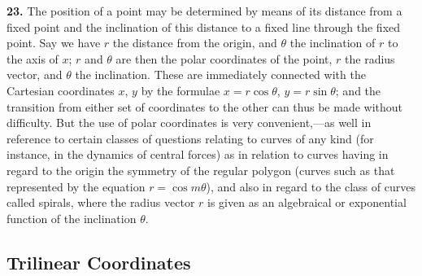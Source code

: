 \documentclass[11pt,a4paper]{article}
\theoremstyle{definition}
\begin{document}
\textbf{23.} The position of a point may be determined by means of its distance from a fixed point and the inclination of this distance to a fixed line through the fixed point. Say we have $r$ the distance from the origin, and $\theta$ the inclination of $r$ to the axis of $x$; $r$ and $\theta$ are then the polar coordinates of the point, $r$ the radius vector, and $\theta$ the inclination. These are immediately connected with the Cartesian coordinates $x$, $y$ by the formulae $x=r\cos\theta$, $y=r\sin\theta$; and the transition from either set of coordinates to the other can thus be made without difficulty. But the use of polar coordinates is very convenient,---as well in reference to certain classes of questions relating to curves of any kind (for instance, in the dynamics of central forces) as in relation to curves having in regard to the origin the symmetry of the regular polygon (curves such as that represented by the equation $r=\cos m\theta$), and also in regard to the class of curves called spirals, where the radius vector $r$ is given as an algebraical or exponential function of the inclination $\theta$.

\subsection*{Trilinear Coordinates}
\end{document}
